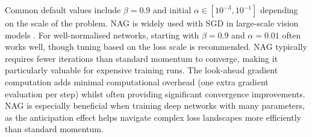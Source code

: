 Common default values include \(\beta=0.9\) and initial \(\alpha\in[10^{-3},10^{-1}]\) depending on the scale of the problem. NAG is widely used with SGD in large-scale vision models \cite{He2016}. For well-normalised networks, starting with \(\beta=0.9\) and \(\alpha=0.01\) often works well, though tuning based on the loss scale is recommended. NAG typically requires fewer iterations than standard momentum to converge, making it particularly valuable for expensive training runs. The look-ahead gradient computation adds minimal computational overhead (one extra gradient evaluation per step) whilst often providing significant convergence improvements. NAG is especially beneficial when training deep networks with many parameters, as the anticipation effect helps navigate complex loss landscapes more efficiently than standard momentum.

